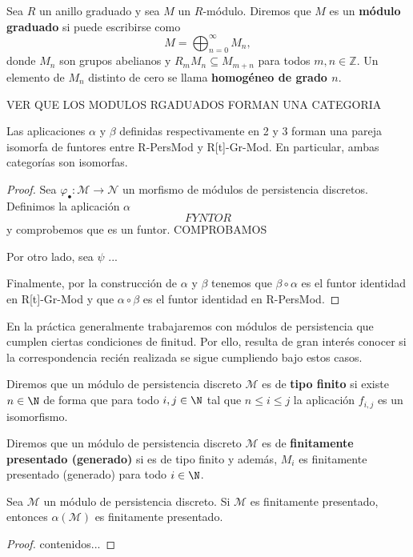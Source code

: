 \begin{definicion}
	Sea \( R \) un anillo graduado y sea \( M \) un \( R \)-módulo. Diremos que \( M \) es un \textbf{módulo graduado} si puede escribirse como
	\[
	M = \bigoplus_{n=0}^{\infty} M_n,
	\]
	donde \( M_n \) son grupos abelianos y \( R_m M_n \subseteq M_{m+n} \) para todos \( m, n \in \mathbb{Z} \). Un elemento de \( M_n \) distinto de cero se llama \textbf{homogéneo de grado \( n \)}.
\end{definicion}
VER QUE LOS MODULOS RGADUADOS FORMAN UNA CATEGORIA
\begin{lema}
	Las aplicaciones $\alpha$ y $\beta$ definidas respectivamente en 2 y 3 forman una pareja isomorfa de funtores entre R-PersMod y R[t]-Gr-Mod. En particular, ambas categorías son isomorfas.
\end{lema}
\begin{proof}
	Sea $\varphi_\bullet : \mathcal{M} \to \mathcal{N}$ un morfismo de módulos de persistencia discretos. Definimos la aplicación $\alpha$
	\[FYNTOR\]
	y comprobemos que es un funtor. COMPROBAMOS
	
	Por otro lado, sea $\psi$ ...
	
	Finalmente, por la construcción de $\alpha$ y $\beta$ tenemos que $\beta \circ \alpha$ es el funtor identidad en R[t]-Gr-Mod y que $\alpha \circ \beta$ es el funtor identidad en R-PersMod.
\end{proof}

En la práctica generalmente trabajaremos con módulos de persistencia que cumplen ciertas condiciones de finitud. Por ello, resulta de gran interés conocer si la correspondencia recién realizada se sigue cumpliendo bajo estos casos.

\begin{definicion}
	Diremos que un módulo de persistencia discreto $\mathcal{M}$ es de \textbf{tipo finito} si existe $n \in \N$ de forma que para todo $i,j \in \N$ tal que $n \leq i \leq j$ la aplicación $f_{i,j}$ es un isomorfismo.
\end{definicion}

\begin{definicion}
	Diremos que un módulo de persistencia discreto $\mathcal{M}$ es de \textbf{finitamente presentado (generado)} si es de tipo finito y además, $M_i$ es finitamente presentado (generado) para todo $i \in \N$.
\end{definicion}

\begin{lema}
	Sea $\mathcal{M}$ un módulo de persistencia discreto. Si $\mathcal{M}$ es finitamente presentado, entonces $\alpha(\mathcal{M})$ es finitamente presentado.
\end{lema}
\begin{proof}
	contenidos...
\end{proof}

